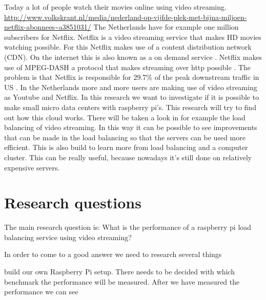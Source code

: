 \documentclass{sig-alternate-br}
\begin{document}
Today a lot of people watch their movies online using video streaming. \url{http://www.volkskrant.nl/media/nederland-op-vijfde-plek-met-bijna-miljoen-netflix-abonnees~a3851031/}
The Netherlands have for example one million subscribers for Netflix. Netflix is a video streaming service that makes HD movies watching possible. For this Netflix makes use of a content distribution network (CDN). On the internet
this is also known as a on demand service \cite{Adhikari:2012}. Netflix makes use of
MPEG-DASH a protocol that makes streaming over http possible \cite{martin:2013}. The problem is that Netflix is responsible for  29.7\% of the peak downstream traffic in US  \cite{Adhikari:2012}. In the Netherlands more and more users are making use of video streaming as Youtube and Netflix.  In this research we want to investigate if it is possible to make small micro data centers with raspberry pi's. This research will try to find out how this cloud works. There will be taken a look in for example the load balancing of video streaming. In this way it can be possible to see improvements that can be made in the load balancing so that the servers can be used more efficient. This is also build to learn more from load balancing and a computer cluster. This can be really useful, because nowadays it's still done on relatively expensive servers. 







\section{Research questions}
The main research question
is: What is the performance of a raspberry pi load balancing service using video streaming?

In order to come to a good answer we need to  research several things

build our own Raspberry Pi setup. There needs to be decided with which benchmark the performance will be measured. After we have measured the performance we can see   
\end{document}
